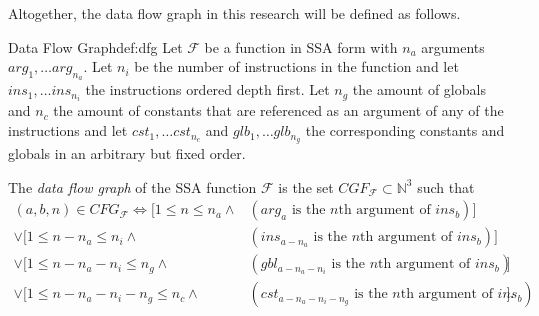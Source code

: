     Altogether, the data flow graph in this research will be defined as follows.

\begin{definition}{Data Flow Graph}{def:dfg}
    Let $\mathcal F$ be a function in SSA form with $n_a$ arguments
    $arg_1,\dots arg_{n_a}$.
    Let $n_i$ be the number of instructions in the function and let
    $ins_1,\dots ins_{n_i}$ the instructions ordered depth first.
    Let $n_g$ the amount of globals and $n_c$ the amount of constants that are
    referenced as an argument of any of the instructions and let
    $cst_1,\dots cst_{n_c}$ and $glb_1,\dots glb_{n_g}$ the corresponding
    constants and globals in an arbitrary but fixed order.

    The {\em data flow graph} of the SSA function $\mathcal F$ is the set
    $CGF_{\mathcal F}\subset \mathbb N^3$ such that
    \begin{align*}
        (a,b,n)\in CFG_{\mathcal F}\iff[1\leq n\leq n_a\land&(arg_a\text{ is the $n$th argument of }ins_b)] \\
                                   \lor[1\leq n-n_a\leq n_i\land&(ins_{a-n_a}\text{ is the $n$th argument of }ins_b)] \\
                                   \lor[1\leq n-n_a-n_i\leq n_g\land&(gbl_{a-n_a-n_i}\text{ is the $n$th argument of }ins_b)] \\
                                   \lor[1\leq n-n_a-n_i-n_g\leq n_c\land&(cst_{a-n_a-n_i-n_g}\text{ is the $n$th argument of }ins_b)].
    \end{align*}
    \end{definition}

